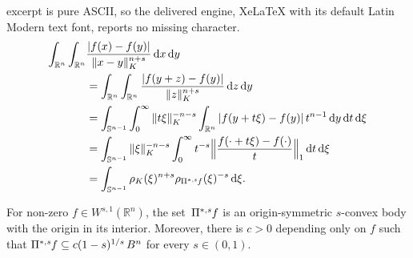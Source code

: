 \documentclass[10pt,a4paper]{amsart}
\newcommand{\Bvtex}{{B^n}}
\newcommand{\dvtex}{\,\mathrm{d}}
\newcommand{\ofpp}[1]{\operatorname{\Pi^{\ast,{\it #1}}}\!}
\newcommand{\snvtex}{{\mathbb S}^{n-1}}
\begin{document}
excerpt is pure ASCII, so the delivered engine, XeLaTeX with its default Latin Modern text font, reports no missing character.
\begin{align}
\int _{\mathbb R^{n}}\int _{\mathbb R^{n}} &
\frac{|f(x)-f(y)|}{\|x-y\|_{K}^{n+s}} \dvtex x \dvtex y
\nonumber \\
&= \int _{\mathbb R^{n}}\int _{\mathbb R^{n}}
\frac{|f(y+z)-f(y)|}{\|z\|_{K}^{n+s}} \dvtex z \dvtex y
\nonumber \\
&= \int _{\snvtex} \int _{0}^{\infty }{\|t \xi \|_{K}^{-n-s}} \int _{
\mathbb R^{n}} {|f(y+t\xi )-f(y)|}\,t^{n-1} \dvtex y \dvtex t \dvtex \xi
\label{eq_frac_func}
\\
&= \int _{\snvtex}{\| \xi \|_{K}^{-n-s}} \int _{0}^{\infty }t^{-s} \Big\|
\frac{f(\cdot +t\xi ) - f(\cdot )}{t}\Big\|_{1} \dvtex t \dvtex \xi
\nonumber \\
&= \int _{\snvtex} \rho _{K}(\xi )^{n+s} \rho _{\ofpp{s} f}(\xi )^{-s}
\dvtex \xi .
\nonumber \end{align}

\begin{proposition}
\label{prop_Mconvexbody}
For non-zero $f \in W^{s,1}(\mathbb R^{n})$, the set $\,\ofpp{s} f$ is
an origin-symmetric $s$-convex body with the origin in its interior. Moreover,
there is $c>0$ depending only on $f$ such that
$\ofpp{s} f \subseteq c (1-s)^{1/s} \, \Bvtex $ for every $s \in (0,1)$.
\end{proposition}
\end{document}
